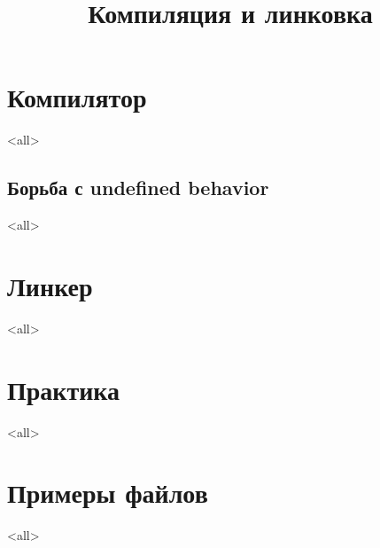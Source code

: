 

\title{Компиляция и линковка}



\begin{frame}
  \frametitle{}
  \titlepage
\end{frame}

\section{Компилятор}

\mode<all>{}

\subsection{Борьба с undefined behavior}

\mode<all>{}

\section{Линкер}

\mode<all>{}

\section[example]{Практика}

\mode<all>{}

\section[example]{Примеры файлов}

\mode<all>{}



